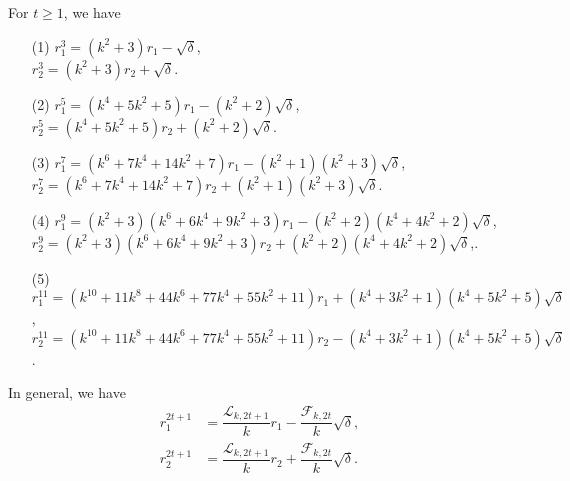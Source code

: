       \begin{lemma}
 For $t\geq 1$, we have\label{3.13}
 \begin{enumerate}
 \item[(1)] $r_1^3=(k^2+3)r_1-\sqrt{\delta}$,\\
   $r_2^3=(k^2+3)r_2+\sqrt{\delta}$.
   \item[(2)]$r_1^5=(k^4+5k^2+5)r_1-(k^2+2)\sqrt{\delta}$,\\
   $r_2^5=(k^4+5k^2+5)r_2+(k^2+2)\sqrt{\delta}$.
    \item[(3)] $r_1^7=(k^6+7k^4+14k^2+7)r_1-(k^2+1)(k^2+3)\sqrt{\delta}$,\\
   $r_2^7=(k^6+7k^4+14k^2+7)r_2+(k^2+1)(k^2+3)\sqrt{\delta}$.
    \item[(4)] $r_1^9=(k^2+3)(k^6+6k^4+9k^2+3)r_1-(k^2+2)(k^4+4k^2+2)\sqrt{\delta}$,\\
   $r_2^9=(k^2+3)(k^6+6k^4+9k^2+3)r_2+(k^2+2)(k^4+4k^2+2)\sqrt{\delta}$,.
   \item[(5)] $r_1^{11}=(k^{10}+11k^8+44k^6+77k^4+55k^2+11)r_1+(k^4+3k^2+1)(k^4+5k^2+5)\sqrt{\delta}$,\\
   $r_2^{11}=(k^{10}+11k^8+44k^6+77k^4+55k^2+11)r_2-(k^4+3k^2+1)(k^4+5k^2+5)\sqrt{\delta}$.
    \end{enumerate}
    In general, we have
    \begin{align*}
    r_1^{2t+1}&=\dfrac{\mathcal{L}_{k,2t+1}}{k}r_1-\dfrac{\mathcal{F}_{k,2t}}{k}\sqrt{\delta},\\
    r_2^{2t+1}&=\dfrac{\mathcal{L}_{k,2t+1}}{k}r_2+\dfrac{\mathcal{F}_{k,2t}}{k}\sqrt{\delta}.
\end{align*}
\end{lemma}
